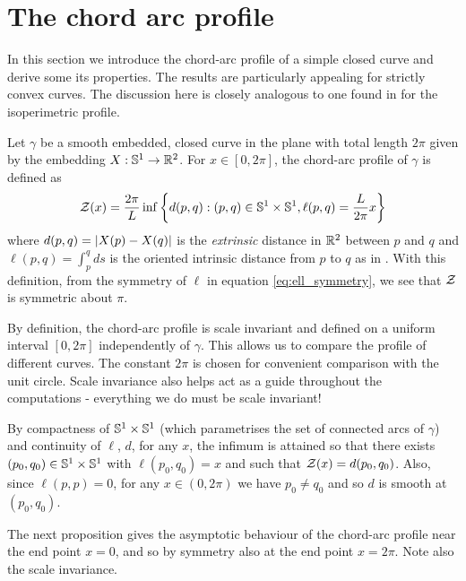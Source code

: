 \documentclass[a4paper, 12pt]{amsart}
\begin{document}
\section{The chord arc profile}
\label{sec:chordarc}

In this section we introduce the chord-arc profile of a simple closed curve and derive some its properties. The results are particularly appealing for strictly convex curves. The discussion here is closely analogous to one found in \cite{Bryan} for the isoperimetric profile.

\begin{defn}
Let $\gamma$ be a smooth embedded, closed curve in the plane with total length $2\pi$ given by the embedding $X: \S^1 \to \R^2$. For $x\in [0,2\pi]$, the chord-arc profile of $\gamma$ is defined as
\[
\chordarcprofile (x) = \frac{2\pi}{L} \inf\left\{d(p, q): (p,q) \in \S^1\times\S^1, \ell(p,q) = \frac{L}{2\pi} x\right\}
\]
where $d(p,q) = \abs{X(p) - X(q)}$ is the \emph{extrinsic} distance in $\R^2$ between $p$ and $q$ and $\ell(p,q) = \int_p^q ds$ is the oriented intrinsic distance from $p$ to $q$ as in . With this definition, from the symmetry of \(\ell\) in equation \eqref{eq:ell_symmetry}, we see that $\chordarcprofile$ is symmetric about $\pi$.
\end{defn}

\begin{rem}
By definition, the chord-arc profile is scale invariant and defined on a uniform interval \([0, 2\pi]\) independently of \(\gamma\). This allows us to compare the profile of different curves. The constant \(2\pi\) is chosen for convenient comparison with the unit circle. Scale invariance also helps act as a guide throughout the computations - everything we do must be scale invariant!
\end{rem}

\begin{rem}
By compactness of $\S^1\times \S^1$ (which parametrises the set of connected arcs of $\gamma$) and continuity of $\ell$, $d$, for any $x$, the infimum is attained so that there exists $(p_0,q_0) \in \S^1 \times \S^1$ with $\ell(p_0, q_0) = x$ and such that $\chordarcprofile(x) = d(p_0, q_0)$. Also, since $\ell(p,p) = 0$, for any $x\in(0,2\pi)$ we have $p_0 \ne q_0$ and so $d$ is smooth at $(p_0, q_0)$.
\end{rem}

The next proposition gives the asymptotic behaviour of the chord-arc profile near the end point $x=0$, and so by symmetry also at the end point $x=2\pi$. Note also the scale invariance.
\end{document}
